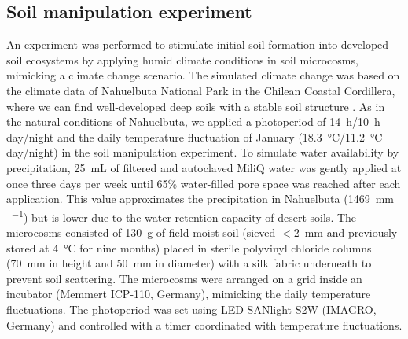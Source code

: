 \subsection{Soil manipulation experiment}

An experiment was performed to stimulate initial soil formation into developed soil ecosystems by applying humid climate conditions in soil microcosms, mimicking a climate change scenario. The simulated climate change was based on the climate data of Nahuelbuta National Park in the Chilean Coastal Cordillera, where we can find well-developed deep soils with a stable soil structure \citep{Bernhard2018, RiverasMunoz2022}. As in the natural conditions of Nahuelbuta, we applied a photoperiod of \SI{14}{\hour}/\SI{10}{\hour} day/night and the daily temperature fluctuation of January (\SI{18.3}{\degreeCelsius}/\SI{11.2}{\degreeCelsius} day/night) in the soil manipulation experiment. To simulate water availability by precipitation, \SI{25}{\milli\liter} of filtered and autoclaved MiliQ water was gently applied at once three days per week until 65\% water-filled pore space was reached after each application. This value approximates the precipitation in Nahuelbuta (\SI{1469}{\milli\metre\,\year^{-1}}) but is lower due to the water retention capacity of desert soils. The microcosms consisted of \SI{130}{\gram} of field moist soil (sieved $<$\SI{2}{\milli\metre} and previously stored at \SI{4}{\degreeCelsius} for nine months) placed in sterile polyvinyl chloride columns (\SI{70}{\milli\metre} in height and \SI{50}{\milli\metre} in diameter) with a silk fabric underneath to prevent soil scattering. The microcosms were arranged on a grid inside an incubator (Memmert ICP-110, Germany), mimicking the daily temperature fluctuations. The photoperiod was set using LED-SANlight S2W (IMAGRO, Germany) and controlled with a timer coordinated with temperature fluctuations.

